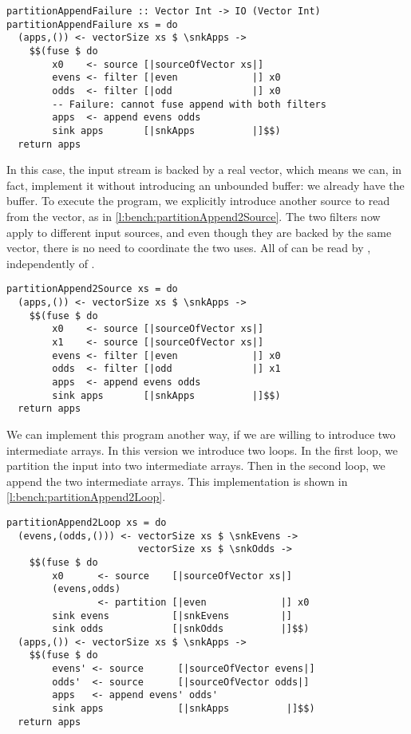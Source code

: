 \begin{lstlisting}[float,label=l:bench:partitionAppendFail,caption=Partition / append fusion failure]
partitionAppendFailure :: Vector Int -> IO (Vector Int)
partitionAppendFailure xs = do
  (apps,()) <- vectorSize xs $ \snkApps ->
    $$(fuse $ do
        x0    <- source [|sourceOfVector xs|]
        evens <- filter [|even             |] x0
        odds  <- filter [|odd              |] x0
        -- Failure: cannot fuse append with both filters
        apps  <- append evens odds
        sink apps       [|snkApps          |]$$)
  return apps
\end{lstlisting}


In this case, the input stream is backed by a real vector, which means we can, in fact, implement it without introducing an unbounded buffer: we already have the buffer.
To execute the program, we explicitly introduce another source to read from the vector, as in \cref{l:bench:partitionAppend2Source}.
The two filters now apply to different input sources, and even though they are backed by the same vector, there is no need to coordinate the two uses.
All of \Hs@evens@ can be read by \Hs@append@, independently of \Hs@odds@.

\begin{lstlisting}[float,label=l:bench:partitionAppend2Source,caption=Partition / append with two sources]
partitionAppend2Source xs = do
  (apps,()) <- vectorSize xs $ \snkApps ->
    $$(fuse $ do
        x0    <- source [|sourceOfVector xs|]
        x1    <- source [|sourceOfVector xs|]
        evens <- filter [|even             |] x0
        odds  <- filter [|odd              |] x1
        apps  <- append evens odds
        sink apps       [|snkApps          |]$$)
  return apps
\end{lstlisting}

We can implement this program another way, if we are willing to introduce two intermediate arrays.
In this version we introduce two loops.
In the first loop, we partition the input into two intermediate arrays.
Then in the second loop, we append the two intermediate arrays.
This implementation is shown in \cref{l:bench:partitionAppend2Loop}.

\begin{lstlisting}[float,label=l:bench:partitionAppend2Loop,caption=Partition / append with two loops]
partitionAppend2Loop xs = do
  (evens,(odds,())) <- vectorSize xs $ \snkEvens ->
                       vectorSize xs $ \snkOdds ->
    $$(fuse $ do
        x0      <- source    [|sourceOfVector xs|]
        (evens,odds)
                <- partition [|even             |] x0
        sink evens           [|snkEvens         |]
        sink odds            [|snkOdds          |]$$)
  (apps,()) <- vectorSize xs $ \snkApps ->
    $$(fuse $ do
        evens' <- source      [|sourceOfVector evens|]
        odds'  <- source      [|sourceOfVector odds|]
        apps   <- append evens' odds'
        sink apps             [|snkApps          |]$$)
  return apps
\end{lstlisting}


